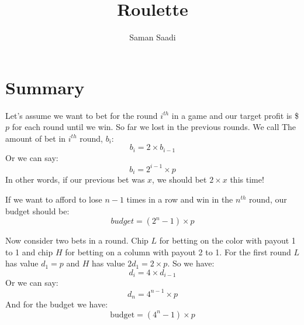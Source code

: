 \documentclass{book}
\title{Roulette}
\author{Saman Saadi}
\date{}
\begin{document}
	\frontmatter
	\maketitle
	\mainmatter
	\section{Summary}
	Let's assume we want to bet for the round $i^{th}$ in a game and our target profit is \$$p$ for each round until we win. So far we lost in the previous rounds. We call The amount of bet in $i^{th}$ round, $b_i$:
	\begin{equation*}
		b_i = 2 \times b_{i - 1}
	\end{equation*}
	Or we can say:
	\begin{equation*}
		b_i = 2^{i - 1} \times p
	\end{equation*}
	In other words, if our previous bet was $x$, we should bet $2 \times x$ this time!
	\par If we want to afford to lose ${n - 1}$ times in a row and win in the $n^{th}$ round, our budget should be:
	\begin{equation*}
		budget = (2^n - 1) \times p
	\end{equation*}
	\par Now consider two bets in a round. Chip $L$ for betting on the color with payout 1 to 1 and chip $H$ for betting on a column with payout 2 to 1. For the first round $L$ has value $d_1 = p$ and $H$ has value $2d_1 = 2 \times p$. So we have:
	\begin{equation*}
		d_i = 4 \times d_{i - 1}
	\end{equation*}
	Or we can say:
	\begin{equation*}
		d_n = 4^{n - 1} \times p
	\end{equation*}
	And for the budget we have:
	\begin{equation*}
		\text{budget} = (4^n - 1) \times p
	\end{equation*}
\end{document}
